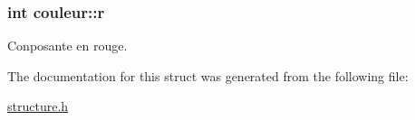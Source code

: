\subsubsection[{\texorpdfstring{r}{r}}]{\setlength{\rightskip}{0pt plus 5cm}int couleur\+::r}\hypertarget{structcouleur_a88aa7196c44cbb8320595a141274af9d}{}\label{structcouleur_a88aa7196c44cbb8320595a141274af9d}
Conposante en rouge. 

The documentation for this struct was generated from the following file\+:\begin{DoxyCompactItemize}
\item 
\hyperlink{structure_8h}{structure.\+h}\end{DoxyCompactItemize}

